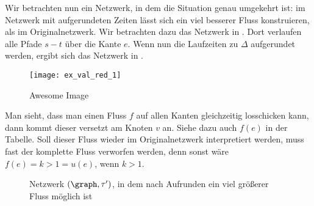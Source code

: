 \begin{example}

    Wir betrachten nun ein Netzwerk, in dem die Situation genau umgekehrt ist:
    im Netzwerk mit aufgerundeten Zeiten lässt sich ein viel besserer Fluss
    konstruieren, als im Originalnetzwerk. Wir betrachten dazu das Netzwerk
    in . Dort verlaufen alle Pfade $s-t$ über die
    Kante $e$. Wenn nun die Laufzeiten zu $\Delta$ aufgerundet werden,
    ergibt sich das Netzwerk in .

    \begin{figure}[H]
    \centering
    \texttt{[image: ex\_val\_red\_1]}
    \caption{Awesome Image}
    \label{fig:ex_val_red_1}
    \end{figure}
    
    Man sieht, dass man einen Fluss $f$ auf allen Kanten gleichzeitig losschicken
    kann, dann kommt dieser versetzt am Knoten $v$ an. Siehe dazu auch
    $f(e)$ in der Tabelle. Soll dieser Fluss wieder im Originalnetzwerk
    interpretiert werden, muss fast der komplette Fluss verworfen werden, denn
    sonst wäre $f(e) = k > 1 = u(e)$, wenn $k > 1$.
    
    \begin{figure}[H]
    \subfloat{\usebox{\tempbox}}%
    \qquad
      \caption{Netzwerk $(\graph, \tau')$, in dem nach Aufrunden ein viel größerer
        Fluss möglich ist}\label{fig:ex_val_red_2}
    \end{figure}    
\end{example}

